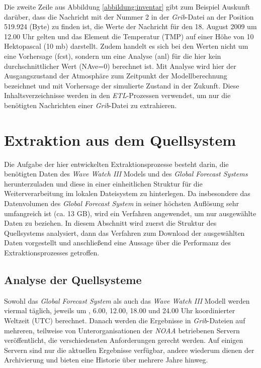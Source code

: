 Die zweite Zeile aus Abbildung \ref{abbildung:inventar} gibt zum
Beispiel Auskunft darüber, dass die Nachricht mit der Nummer 2 in der
\textit{Grib}-Datei an der Position 519.924 (Byte) zu finden ist, die
Werte der Nachricht für den 18. August 2009 um 12.00 Uhr gelten und
das Element die Temperatur (TMP) auf einer Höhe von 10 Hektopascal (10
mb) darstellt. Zudem handelt es sich bei den Werten nicht um eine
Vorhersage (fcst), sondern um eine Analyse (anl) für die hier kein
durchschnittlicher Wert (NAve=0) berechnet ist. Mit Analyse wird hier
der Ausgangszustand der Atmosphäre zum Zeitpunkt der Modellberechnung
bezeichnet und mit Vorhersage der simulierte Zustand in der
Zukunft. Diese Inhaltsverzeichnisse werden in den
\textit{ETL}-Prozessen verwendet, um nur die benötigten Nachrichten
einer \textit{Grib}-Datei zu extrahieren.

\section{Extraktion aus dem Quellsystem}
Die Aufgabe der hier entwickelten Extraktionsprozesse besteht darin,
die benötigten Daten des \textit{Wave Watch III} Models und des
\textit{Global Forecast Systems} herunterzuladen und diese in einer
einheitlichen Struktur für die Weiterverarbeitung im lokalen
Dateisystem zu hinterlegen. Da insbesondere das Datenvolumen des
\textit{Global Forecast System} in seiner höchsten Auflösung sehr
umfangreich ist (ca. 13 GB), wird ein Verfahren angewendet, um nur
ausgewählte Daten zu beziehen. In diesem Abschnitt wird zuerst die
Struktur des Quellsystems analysiert, dann das Verfahren zum Download
der ausgewählten Daten vorgestellt und anschließend eine Aussage über
die Performanz des Extraktionsprozesses getroffen.

\subsection{Analyse der Quellsysteme}
Sowohl das \textit{Global Forecast System} als auch das \textit{Wave
  Watch III} Modell werden viermal täglich, jeweils um , 6.00, 12.00,
18.00 und 24.00 Uhr koordinierter Weltzeit (UTC) berechnet. Danach
werden die Ergebnisse in \textit{Grib}-Dateien auf mehreren, teilweise
von Unterorganisationen der \textit{NOAA} betriebenen Servern
veröffentlicht, die verschiedensten Anforderungen gerecht werden. Auf
einigen Servern sind nur die aktuellen Ergebnisse verfügbar, andere
wiederum dienen der Archivierung und bieten eine Historie über mehrere
Jahre hinweg.

